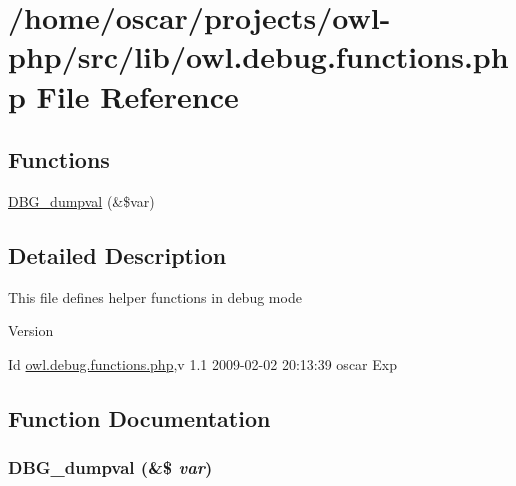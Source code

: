 \section{/home/oscar/projects/owl-\/php/src/lib/owl.debug.functions.php File Reference}
\label{owl_8debug_8functions_8php}
\subsection*{Functions}
\begin{DoxyCompactItemize}
\item 
\hyperlink{owl_8debug_8functions_8php_a65a2d146de0c2b3a89eb4c118a88905f}{DBG\_\-dumpval} (\&\$var)
\end{DoxyCompactItemize}


\subsection{Detailed Description}
This file defines helper functions in debug mode \begin{DoxyVersion}{Version}

\end{DoxyVersion}
\begin{DoxyParagraph}{Id}
\hyperlink{owl_8debug_8functions_8php}{owl.debug.functions.php},v 1.1 2009-\/02-\/02 20:13:39 oscar Exp 
\end{DoxyParagraph}


\subsection{Function Documentation}
\subsubsection[{DBG\_\-dumpval}]{\setlength{\rightskip}{0pt plus 5cm}DBG\_\-dumpval (\&\$ {\em var})}\label{owl_8debug_8functions_8php_a65a2d146de0c2b3a89eb4c118a88905f}
